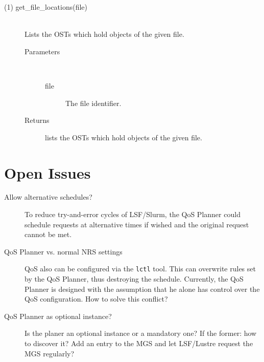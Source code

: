 \documentclass[10pt]{article}
\begin{document}
\begin{description}
\item[(1) get\_file\_locations(file)]~\\ Lists the OSTs which hold objects of the given file.
  \begin{description}
    \item[Parameters]~\\
        \begin{description}
            \item[file] The file identifier.
        \end{description}
    \item[Returns] lists the OSTs which hold objects of the given file.
  \end{description}
\end{description}



\section{Open Issues}

\begin{description}
 \item[Allow alternative schedules?] To reduce try-and-error cycles of LSF/Slurm, the QoS Planner could schedule requests at alternative times if wished and the original request cannot be met.

 \item[QoS Planner vs. normal NRS settings] QoS also can be configured via the \texttt{lctl} tool.
 This can overwrite rules set by the QoS Planner, thus destroying the schedule.
 Currently, the QoS Planner is designed with the assumption that he alone has control over the QoS configuration.
 How to solve this conflict?

 \item[QoS Planner as optional instance?] Is the planer an optional instance or a mandatory one?
 If the former: how to discover it?
 Add an entry to the MGS and let LSF/Lustre request the MGS regularly?
\end{description}
\end{document}
